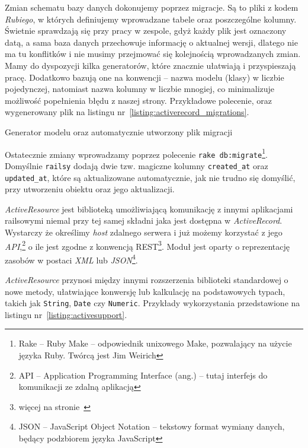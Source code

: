 \documentclass[12pt,twoside]{report}
\begin{document}
Zmian schematu bazy danych dokonujemy poprzez migracje. Są to pliki z kodem \emph{Rubiego},
w których definiujemy wprowadzane tabele oraz poszczególne kolumny. Świetnie sprawdzają
się przy pracy w zespole, gdyż każdy plik jest oznaczony datą, a sama baza danych
przechowuje informację o aktualnej wersji, dlatego nie ma tu konflitków i nie musimy
przejmować się kolejnością wprowadzanych zmian. Mamy do dyspozycji kilka generatorów,
które znacznie ułatwiają i przyspieszają pracę. Dodatkowo bazują one na konwencji -- nazwa
modelu (klasy) w liczbie pojedynczej, natomiast nazwa kolumny w liczbie mnogiej, co
minimalizuje możliwość popełnienia błędu z naszej strony. Przykładowe polecenie, oraz
wygenerowany plik na listingu nr~\ref{listing:activerecord_migrations}.

\begin{listing}
  
  \caption{Generator modelu oraz automatycznie utworzony plik migracji}
  \label{listing:activerecord_migrations}
\end{listing}


Ostatecznie zmiany wprowadzamy poprzez polecenie \texttt{rake db:migrate}\footnote{Rake --
Ruby Make -- odpowiednik unixowego Make, pozwalający na użycie języka Ruby. Twórcą
jest Jim Weirich}. Domyślnie \texttt{railsy} dodają dwie tzw. magiczne kolumny
\texttt{created\_at} oraz \texttt{updated\_at}, które są aktualizowane automatycznie, jak
nie trudno się domyślić, przy utworzeniu obiektu oraz jego aktualizacji.


\emph{ActiveResource} jest biblioteką umożliwiającą komunikację z innymi
aplikacjami railsowymi niemal przy tej samej składni jaka jest dostępna w \emph
{ActiveRecord}. Wystarczy że określimy \emph{host} zdalnego serwera i już
możemy korzystać z jego \emph{API},\footnote{API -- Application Programming
Interface (ang.) -- tutaj interfejs do komunikacji ze zdalną aplikacją} o ile
jest zgodne z konwencją REST\footnote{więcej na stronie~\pageref{sec:rest}}.
Moduł jest oparty o reprezentację zasobów w postaci \emph{XML} lub
\emph{JSON}\footnote{JSON -- JavaScript Object Notation -- tekstowy format wymiany
danych, będący podzbiorem języka JavaScript}.


\emph{ActiveResource} przynosi między innymi rozszerzenia biblioteki
standardowej o nowe metody, ułatwiające konwersję lub kalkulację na podstawowych
typach, takich jak \texttt{String}, \texttt{Date} czy \texttt{Numeric}. Przykłady
wykorzystania przedstawione na listingu nr~\ref{listing:activesupport}.
\end{document}
